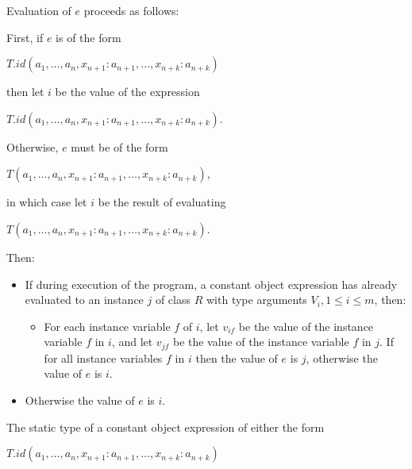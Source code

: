 \documentclass{article}
\begin{document}
\LMHash{}
Evaluation of $e$ proceeds as follows:

\LMHash{}
First, if $e$ is of the form

\CONST{} $T.id(a_1, \ldots , a_n, x_{n+1}: a_{n+1}, \ldots , x_{n+k}: a_{n+k})$

then let $i$ be the value of the expression

\NEW{} $T.id(a_1, \ldots , a_n, x_{n+1}: a_{n+1}, \ldots , x_{n+k}: a_{n+k})$.

\LMHash{}
Otherwise, $e$ must be of the form

\CONST{} $T(a_1, \ldots , a_n, x_{n+1}: a_{n+1}, \ldots , x_{n+k}: a_{n+k})$,

in which case let $i$ be the result of evaluating

\NEW{} $T(a_1, \ldots , a_n, x_{n+1}: a_{n+1}, \ldots , x_{n+k}: a_{n+k})$.

\LMHash{}
Then:
\begin{itemize}
\item If during execution of the program, a constant object expression has already evaluated to an instance $j$ of class $R$ with type arguments $V_i, 1 \le i \le m$, then:
\begin{itemize}
\item For each instance variable $f$ of $i$, let $v_{if}$ be the value of the instance variable $f$ in $i$, and let $v_{jf}$ be the value of the instance variable $f$ in $j$.
  If  for all instance variables $f$ in $i$ then the value of $e$ is $j$, otherwise the value of $e$ is $i$.
\end{itemize}
\item Otherwise the value of $e$ is $i$.
\end{itemize}


\LMHash{}
The static type of a constant object expression of either the form

\CONST{} $T.id(a_1, \ldots , a_n, x_{n+1}: a_{n+1}, \ldots , x_{n+k}: a_{n+k})$
\end{document}
